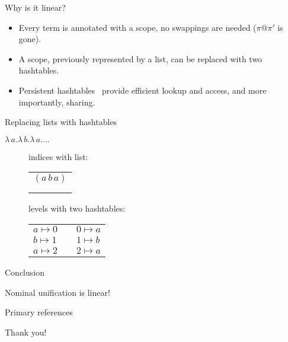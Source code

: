 \documentclass[pdf]{beamer}
\begin{document}
\begin{frame}{Why is it linear?}
  
  \begin{itemize}
  \item Every term is annotated with a scope, no swappings are needed
    ($\pi@\pi'$ is gone).
  
  \item A scope, previously represented by a list,
    can be replaced with two hashtables.
    
  \item Persistent hashtables~\citep{bagwell_ideal_2001} provide
    efficient lookup and access, and more importantly, sharing.
  \end{itemize}
\end{frame}

\begin{frame}{Replacing lists with hashtables}

  {\centering
    $\lambda\,a.\lambda\,b.\lambda\,a. ...$
  \par}
  \begin{figure}[H]
  \centering
  \begin{minipage}{0.45\textwidth}
    \centering
    indices with list: \\
    \begin{tabular}{l}
      $(a\,b\,a)$ \\
      \\ \\
      \end{tabular}
  \end{minipage}\hfill
    \begin{minipage}{0.45\textwidth}
    \centering
    levels with two hashtables:
    \begin{tabular}{l l l}
      $a \mapsto 0$ & & $0 \mapsto a$ \\
      $b \mapsto 1$ & & $1 \mapsto b$ \\
      $a \mapsto 2$ & & $2 \mapsto a$ \\
    \end{tabular}
    \end{minipage}
  \end{figure}

\end{frame}

\begin{frame}{Conclusion}
  
  {\centering
    \Huge Nominal unification is linear!
    \par}
\end{frame}
 
\begin{frame}{Primary references}


\end{frame}

\begin{frame}
  \begin{center}
    \Huge Thank you!
   \end{center}
\end{frame}
  
\end{document}
